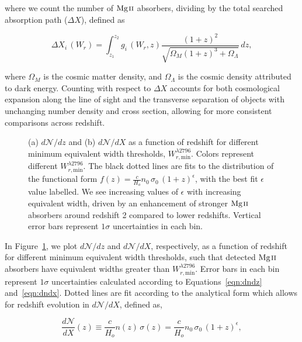 \documentclass[iop,apj,numberedappendix,appendixfloats,twocolappendix]{emulateapj}
\begin{document}
\noindent
where we count the number of ${\hbox{{\rm Mg}\kern 0.1em{\sc ii}}}$ absorbers, dividing by the total searched absorption path ($\Delta X$), defined as

\begin{equation}
\Delta X_i\,(W_r) = \int_{z_1}^{z_2} g_i\,(W_r, z) \frac{(1 + z)^2}{\sqrt{\Omega_M (1 + z)^3 + \Omega_{\Lambda}}}\,dz,
\label{eqn:deltax}
\end{equation}

\noindent
where $\Omega_M$ is the cosmic matter density, and $\Omega_{\Lambda}$ is the cosmic density attributed to dark energy. Counting with respect to $\Delta X$ accounts for both cosmological expansion along the line of sight and the transverse separation of objects with unchanging number density and cross section, allowing for more consistent comparisons across redshift.

\begin{figure*}[bth]
\caption{(a) $d\mathcal{N}\!/dz$ and (b) $d\mathcal{N}\!/dX$ as a function of redshift for different minimum equivalent width thresholds, $W_{r,\mathrm{min}}^{\lambda2796}$. Colors represent different $W_{r,\mathrm{min}}^{\lambda2796}$. The black dotted lines are fits to the distribution of the functional form $f(z) = \frac{c}{H_o} n_0\,\sigma_0\,(1 + z)^{\epsilon}$, with the best fit $\epsilon$ value labelled. We see increasing values of $\epsilon$ with increasing equivalent width, driven by an enhancement of stronger ${\hbox{{\rm Mg}\kern 0.1em{\sc ii}}}$ absorbers around redshift 2 compared to lower redshifts. Vertical error bars represent $1\sigma$ uncertainties in each bin.}
\label{fig:dndz_dndx}
\end{figure*}

In Figure~\ref{fig:dndz_dndx}, we plot $d\mathcal{N}\!/dz$ and $d\mathcal{N}\!/dX$, respectively, as a function of redshift for different minimum equivalent width thresholds, such that detected ${\hbox{{\rm Mg}\kern 0.1em{\sc ii}}}$ absorbers have equivalent widths greater than $W_{r,\mathrm{min}}^{\lambda2796}$. Error bars in each bin represent $1\sigma$ uncertainties calculated according to Equations~\ref{eqn:dndz} and~\ref{eqn:dndx}. Dotted lines are fit according to the analytical form which allows for redshift evolution in $d\mathcal{N}\!/dX$, defined as,

\begin{equation}
\frac{d \mathcal{N}}{d X}(z) \equiv  \frac{c}{H_o} n(z)\,\sigma(z) =  \frac{c}{H_o} n_0\,\sigma_0\,(1+z)^{\epsilon},
\label{eqn:dndxfit}
\end{equation}
\end{document}
